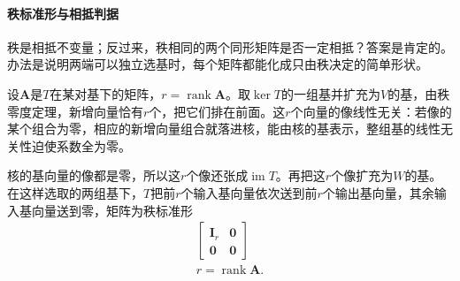 \paragraph{秩标准形与相抵判据}
\label{sec:ls-equivalence-conditions}
秩是相抵不变量；反过来，秩相同的两个同形矩阵是否一定相抵？答案是肯定的。办法是说明两端可以独立选基时，每个矩阵都能化成只由秩决定的简单形状。

设$\bm A$是$T$在某对基下的矩阵，$r=\operatorname{rank}\bm A$。取$\ker T$的一组基并扩充为$V$的基，由秩零度定理，新增向量恰有$r$个，把它们排在前面。这$r$个向量的像线性无关：若像的某个组合为零，相应的新增向量组合就落进核，能由核的基表示，整组基的线性无关性迫使系数全为零。

核的基向量的像都是零，所以这$r$个像还张成$\operatorname{im}T$。再把这$r$个像扩充为$W$的基。在这样选取的两组基下，$T$把前$r$个输入基向量依次送到前$r$个输出基向量，其余输入基向量送到零，矩阵为秩标准形
\begin{equation}
\begin{gathered}
\begin{bmatrix}\bm I_r&\bm0\\\bm0&\bm0\end{bmatrix}\\
r=\operatorname{rank}\bm A.
\end{gathered}
\label{eq:ls-rank-normal-form}
\end{equation}


